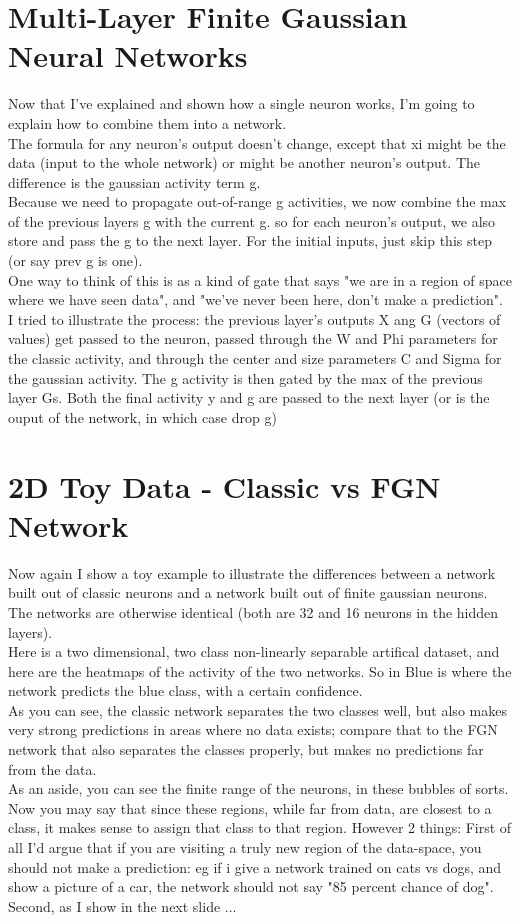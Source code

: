\documentclass{article}
\begin{document}
\section{Multi-Layer Finite Gaussian Neural Networks}
Now that I've explained and shown how a single neuron works, I'm going to explain how to combine them into a network.\\
The formula for any neuron's output doesn't change, except that xi might be the data (input to the whole network) or might be another neuron's output. The difference is the gaussian activity term g.\\
Because we need to propagate out-of-range g activities, we now combine the max of the previous layers g with the current g. so for each neuron's output, we also store and pass the g to the next layer. For the initial inputs, just skip this step (or say prev g is one).\\
One way to think of this is as a kind of gate that says "we are in a region of space where we have seen data", and "we've never been here, don't make a prediction".\\
I tried to illustrate the process: the previous layer's outputs X ang G (vectors of values) get passed to the neuron, passed through the W and Phi parameters for the classic activity, and through the center and size parameters C and Sigma for the gaussian activity. The g activity is then gated by the max of the previous layer Gs. Both the final activity y and g are passed to the next layer (or is the ouput of the network, in which case drop g)

\section{2D Toy Data - Classic vs FGN Network}
Now again I show a toy example to illustrate the differences between a network built out of classic neurons and a network built out of finite gaussian neurons. The networks are otherwise identical (both are 32 and 16 neurons in the hidden layers).\\
Here is a two dimensional, two class non-linearly separable artifical dataset, and here are the heatmaps of the activity of the two networks. So in Blue is where the network predicts the blue class, with a certain confidence.\\
As you can see, the classic network separates the two classes well, but also makes very strong predictions in areas where no data exists; compare that to the FGN network that also separates the classes properly, but makes no predictions far from the data.\\
As an aside, you can see the finite range of the neurons, in these bubbles of sorts.\\
Now you may say that since these regions, while far from data, are closest to a class, it makes sense to assign that class to that region. However 2 things: First of all I'd argue that if you are visiting a truly new region of the data-space, you should not make a prediction: eg if i give a network trained on cats vs dogs, and show a picture of a car, the network should not say "85 percent chance of dog". \\
Second, as I show in the next slide ... \\
\end{document}
